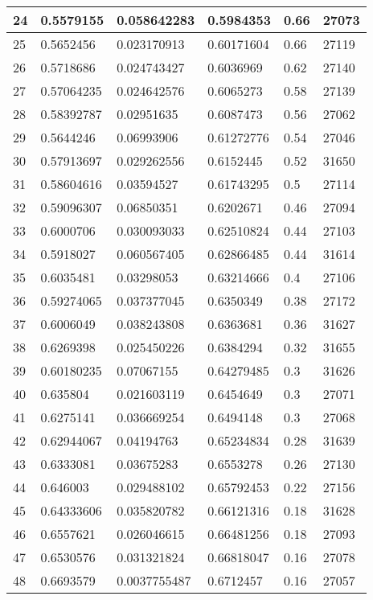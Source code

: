 \begin{longtable}{|l|l|l|l|l|l|}
24 & 0.5579155 & 0.058642283 & 0.5984353 & 0.66 & 27073 \\ \hline 
25 & 0.5652456 & 0.023170913 & 0.60171604 & 0.66 & 27119 \\ \hline 
26 & 0.5718686 & 0.024743427 & 0.6036969 & 0.62 & 27140 \\ \hline 
27 & 0.57064235 & 0.024642576 & 0.6065273 & 0.58 & 27139 \\ \hline 
28 & 0.58392787 & 0.02951635 & 0.6087473 & 0.56 & 27062 \\ \hline 
29 & 0.5644246 & 0.06993906 & 0.61272776 & 0.54 & 27046 \\ \hline 
30 & 0.57913697 & 0.029262556 & 0.6152445 & 0.52 & 31650 \\ \hline 
31 & 0.58604616 & 0.03594527 & 0.61743295 & 0.5 & 27114 \\ \hline 
32 & 0.59096307 & 0.06850351 & 0.6202671 & 0.46 & 27094 \\ \hline 
33 & 0.6000706 & 0.030093033 & 0.62510824 & 0.44 & 27103 \\ \hline 
34 & 0.5918027 & 0.060567405 & 0.62866485 & 0.44 & 31614 \\ \hline 
35 & 0.6035481 & 0.03298053 & 0.63214666 & 0.4 & 27106 \\ \hline 
36 & 0.59274065 & 0.037377045 & 0.6350349 & 0.38 & 27172 \\ \hline 
37 & 0.6006049 & 0.038243808 & 0.6363681 & 0.36 & 31627 \\ \hline 
38 & 0.6269398 & 0.025450226 & 0.6384294 & 0.32 & 31655 \\ \hline 
39 & 0.60180235 & 0.07067155 & 0.64279485 & 0.3 & 31626 \\ \hline 
40 & 0.635804 & 0.021603119 & 0.6454649 & 0.3 & 27071 \\ \hline 
41 & 0.6275141 & 0.036669254 & 0.6494148 & 0.3 & 27068 \\ \hline 
42 & 0.62944067 & 0.04194763 & 0.65234834 & 0.28 & 31639 \\ \hline 
43 & 0.6333081 & 0.03675283 & 0.6553278 & 0.26 & 27130 \\ \hline 
44 & 0.646003 & 0.029488102 & 0.65792453 & 0.22 & 27156 \\ \hline 
45 & 0.64333606 & 0.035820782 & 0.66121316 & 0.18 & 31628 \\ \hline 
46 & 0.6557621 & 0.026046615 & 0.66481256 & 0.18 & 27093 \\ \hline 
47 & 0.6530576 & 0.031321824 & 0.66818047 & 0.16 & 27078 \\ \hline 
48 & 0.6693579 & 0.0037755487 & 0.6712457 & 0.16 & 27057 \\ \hline 

\end{longtable}

